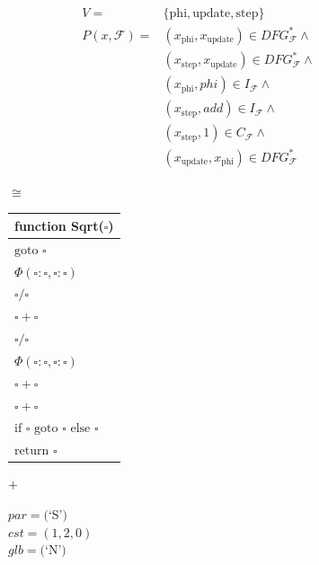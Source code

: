 \begin{figure}
\begin{minipage}{0.4\textwidth}
    \begin{align*}
        V=&\{\text{phi}, \text{update}, \text{step}\}\\
        P(x,\mathcal F)=&(x_\text{phi},x_\text{update})\in DFG_\mathcal{F}^*\land\\
                        &(x_\text{step},x_\text{update})\in DFG_\mathcal{F}^*\land\\
                        &(x_\text{phi}, phi)\in I_\mathcal{F}\land\\
                        &(x_\text{step}, add)\in I_\mathcal{F}\land\\
                        &(x_\text{step},1)\in C_\mathcal{F}\land\\
                        &(x_\text{update},x_\text{phi})\in DFG_\mathcal{F}^*
    \end{align*}
\end{minipage}
\begin{minipage}{0.04\textwidth}
\centering
$\cong$
\end{minipage}
\begin{minipage}{0.22\textwidth}
\begin{tabular}{|l|}
\multicolumn{1}{c}{{\bf function} Sqrt($\square$)}\\
\hline
$\text{goto } \square$\\
$\Phi(\square:\square,\square:\square)$\\
$\square/\square$\\
$\square+\square$\\
$\square/\square$\\
$\Phi(\square:\square,\square:\square)$\\
$\square+\square$\\
$\square+\square$\\
$\text{if }\square\text{ goto }\square\text{ else }\square$\\
$\text{return }\square$\\
\hline
\end{tabular}
\end{minipage}
\begin{minipage}{0.04\textwidth}
\centering
$+$
\end{minipage}
\begin{minipage}{0.27\textwidth}
$par=($`S'$)$\\
$cst=(1,2,0)$\\
$glb=($`N'$)$\\

\end{minipage}
\end{figure}
